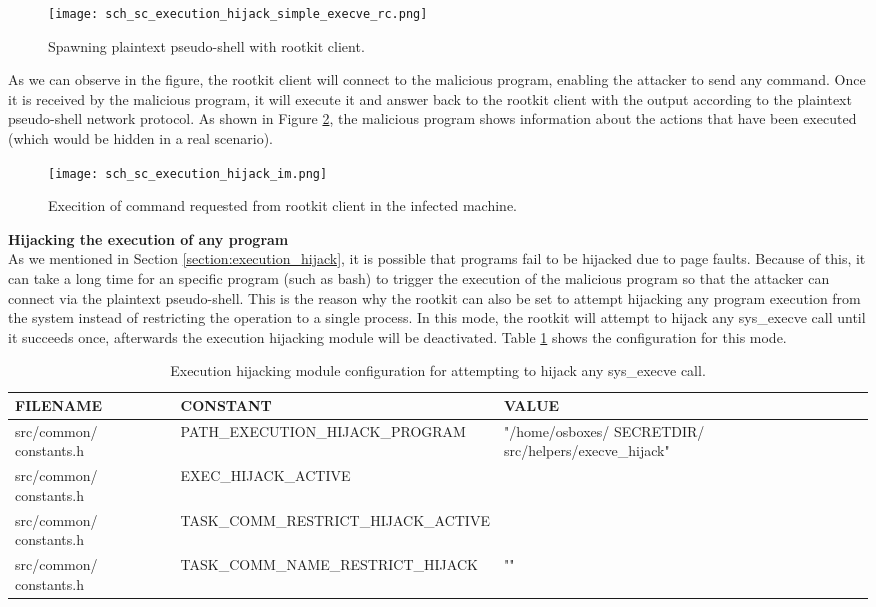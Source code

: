 \begin{figure}[htbp]
	\centering
	\texttt{[image: sch\_sc\_execution\_hijack\_simple\_execve\_rc.png]}
	\caption{Spawning plaintext pseudo-shell with rootkit client.}
	\label{fig:sc_execution_hijack_simple_execve_rc}
\end{figure}

As we can observe in the figure, the rootkit client will connect to the malicious program, enabling the attacker to send any command. Once it is received by the malicious program, it will execute it and answer back to the rootkit client with the output according to the plaintext pseudo-shell network protocol. As shown in Figure \ref{fig:sc_execution_hijack_im}, the malicious program shows information about the actions that have been executed (which would be hidden in a real scenario).

\begin{figure}[htbp]
	\centering
	\texttt{[image: sch\_sc\_execution\_hijack\_im.png]}
	\caption{Execition of command requested from rootkit client in the infected machine.}
	\label{fig:sc_execution_hijack_im}
\end{figure}


\textbf{Hijacking the execution of any program}\\
As we mentioned in Section \ref{section:execution_hijack}, it is possible that programs fail to be hijacked due to page faults. Because of this, it can take a long time for an specific program (such as bash) to trigger the execution of the malicious program so that the attacker can connect via the plaintext pseudo-shell. This is the reason why the rootkit can also be set to attempt hijacking any program execution from the system instead of restricting the operation to a single process. In this mode, the rootkit will attempt to hijack any sys\_execve call until it succeeds once, afterwards the execution hijacking module will be deactivated. Table \ref{table:execution_hijack_config_any} shows the configuration for this mode.

\begin{table}[htbp]
\begin{tabular}{|>{\centering\arraybackslash}p{3cm}|>{\centering\arraybackslash}p{4.5cm}|>{\centering\arraybackslash}p{4cm}|}
\hline
\textbf{FILENAME} & \textbf{CONSTANT} & \textbf{VALUE}\\
\hline
\hline
src/common/ constants.h & PATH\_EXECUTION\_HIJACK\_PROGRAM & "/home/osboxes/ SECRETDIR/ src/helpers/execve\_hijack"\\
\hline
src/common/ constants.h & EXEC\_HIJACK\_ACTIVE & 1\\
\hline
src/common/ constants.h & TASK\_COMM\_RESTRICT\_HIJACK\_ACTIVE & 0\\
\hline
src/common/ constants.h & TASK\_COMM\_NAME\_RESTRICT\_HIJACK & ""\\
\hline
\end{tabular}
\caption{Execution hijacking module configuration for attempting to hijack any sys\_execve call.}
\label{table:execution_hijack_config_any}
\end{table}

